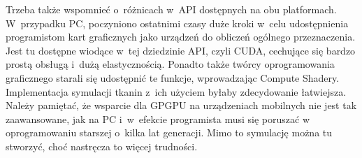 	Trzeba także wspomnieć o~różnicach w~API dostępnych na obu platformach. W~przypadku PC, poczyniono ostatnimi czasy duże kroki w~celu udostępnienia programistom kart graficznych jako urządzeń do obliczeń ogólnego przeznaczenia. Jest tu dostępne wiodące w~tej dziedzinie API, czyli CUDA, cechujące się bardzo prostą obsługą i~dużą elastycznością. Ponadto także twórcy oprogramowania graficznego starali się udostępnić te funkcje, wprowadzając Compute Shadery. Implementacja symulacji tkanin z~ich użyciem byłaby zdecydowanie łatwiejsza. Należy pamiętać, że wsparcie dla GPGPU na urządzeniach mobilnych nie jest tak zaawansowane, jak na PC i~w~efekcie programista musi się poruszać w oprogramowaniu starszej o~kilka lat generacji. Mimo to symulację można tu stworzyć, choć nastręcza to więcej trudności.
	
	
	
	
	
	

